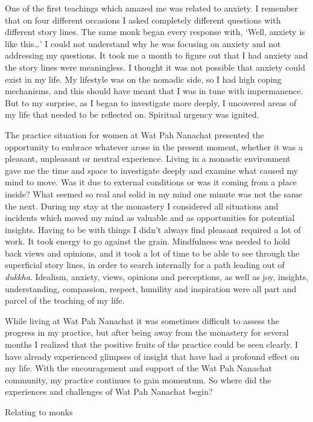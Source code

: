 One of the first teachings which amazed me was related to anxiety. I
remember that on four different occasions I asked completely different
questions with different story lines. The same monk began every response
with, `Well, anxiety is like this\ldots{}' I could not understand why he
was focusing on anxiety and not addressing my questions. It took me a
month to figure out that I had anxiety and the story lines were
meaningless. I thought it was not possible that anxiety could exist in
my life. My lifestyle was on the nomadic side, so I had high coping
mechanisms, and this should have meant that I was in tune with
impermanence. But to my surprise, as I began to investigate more deeply,
I uncovered areas of my life that needed to be reflected on. Spiritual
urgency was ignited.

The practice situation for women at Wat Pah Nanachat presented the
opportunity to embrace whatever arose in the present moment, whether it
was a pleasant, unpleasant or neutral experience. Living in a monastic
environment gave me the time and space to investigate deeply and examine
what caused my mind to move. Was it due to external conditions or was it
coming from a place inside? What seemed so real and solid in my mind one
minute was not the same the next. During my stay at the monastery I
considered all situations and incidents which moved my mind as valuable
and as opportunities for potential insights. Having to be with things I
didn't always find pleasant required a lot of work. It took energy to go
against the grain. Mindfulness was needed to hold back views and
opinions, and it took a lot of time to be able to see through the
superficial story lines, in order to search internally for a path
leading out of \emph{dukkha}. Idealism, anxiety, views, opinions and
perceptions, as well as joy, insights, understanding, compassion,
respect, humility and inspiration were all part and parcel of the
teaching of my life.

While living at Wat Pah Nanachat it was sometimes difficult to assess
the progress in my practice, but after being away from the monastery for
several months I realized that the positive fruits of the practice could
be seen clearly. I have already experienced glimpses of insight that
have had a profound effect on my life. With the encouragement and
support of the Wat Pah Nanachat community, my practice continues to gain
momentum. So where did the experiences and challenges of Wat Pah
Nanachat begin?

Relating to monks

